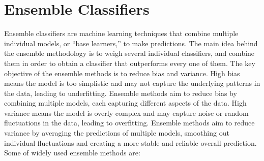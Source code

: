 \section{Ensemble Classifiers}
Ensemble classifiers are machine learning techniques that combine multiple individual models, or ``base learners,'' to make predictions. The main idea behind the ensemble methodology is to weigh several individual classifiers, and combine them in order to obtain a classifier that outperforms every one of them. The key objective of the ensemble methods is to reduce bias and variance. High bias means the model is too simplistic and may not capture the underlying patterns in the data, leading to underfitting. Ensemble methods aim to reduce bias by combining multiple models, each capturing different aspects of the data. High variance means the model is overly complex and may capture noise or random fluctuations in the data, leading to overfitting. Ensemble methods aim to reduce variance by averaging the predictions of multiple models, smoothing out individual fluctuations and creating a more stable and reliable overall prediction.\\
Some of widely used ensemble methods are:
